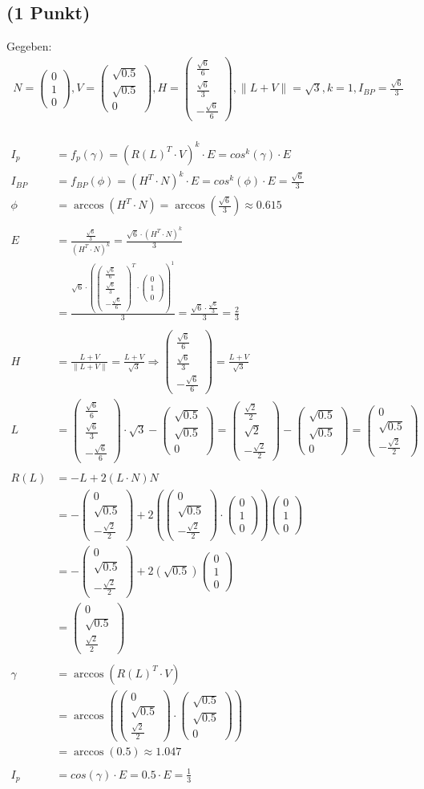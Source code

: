 \documentclass[a4paper,10pt,DIV=14]{article}
\begin{document}
\subsection{(1 Punkt)}%
\newcommand{\VecThree}[3]{\begin{pmatrix} #1 \\ #2 \\ #3 \end{pmatrix}}
Gegeben:
\begin{gather*}
N = \VecThree{0}{1}{0}, V = \VecThree{\sqrt{0.5}}{\sqrt{0.5}}{0}, H = \VecThree{\frac{\sqrt{6}}{6}}{\frac{\sqrt{6}}{3}}{-\frac{\sqrt{6}}{6}}, \lVert L+V \rVert = \sqrt{3}, k = 1, I_{BP} = \frac{\sqrt{6}}{3}
\end{gather*}
\\
\begin{align*}
I_p &= f_p(\gamma) = (R(L)^T \cdot V)^k \cdot E = cos^k(\gamma) \cdot E \\
I_{BP} &= f_{BP}(\phi) = (H^T \cdot N)^k \cdot E = cos^k(\phi) \cdot E = \frac{\sqrt{6}}{3}\\
\phi &= \arccos(H^T \cdot N) = \arccos\left(\frac{\sqrt{6}}{3}\right) \approx 0.615\\~\\
E &= \frac{\frac{\sqrt{6}}{3}}{(H^T \cdot N)^k} = \frac{\sqrt{6} \cdot (H^T \cdot N)^k}{3} \\
&= \frac{\sqrt{6} \cdot \left(\VecThree{\frac{\sqrt{6}}{6}}{\frac{\sqrt{6}}{3}}{-\frac{\sqrt{6}}{6}}^T \cdot \VecThree{0}{1}{0}\right)^1}{3} = \frac{\sqrt{6} \cdot \frac{\sqrt{6}}{3}}{3} =  \frac{2}{3}\\~\\
H &= \frac{L+V}{\lVert L+V \rVert} = \frac{L+V}{\sqrt{3}} \Rightarrow
\VecThree{\frac{\sqrt{6}}{6}}{\frac{\sqrt{6}}{3}}{-\frac{\sqrt{6}}{6}} = \frac{L+V}{\sqrt{3}} \\
L &= \VecThree{\frac{\sqrt{6}}{6}}{\frac{\sqrt{6}}{3}}{-\frac{\sqrt{6}}{6}} \cdot \sqrt{3} - \VecThree{\sqrt{0.5}}{\sqrt{0.5}}{0} = \VecThree{\frac{\sqrt{2}}{2}}{\sqrt{2}}{-\frac{\sqrt{2}}{2}} - \VecThree{\sqrt{0.5}}{\sqrt{0.5}}{0} = \VecThree{0}{\sqrt{0.5}}{-\frac{\sqrt{2}}{2}}\\~\\
R(L) &= - L + 2 \left(L \cdot N \right) N \\
&= - \VecThree{0}{\sqrt{0.5}}{-\frac{\sqrt{2}}{2}} + 2 \left(\VecThree{0}{\sqrt{0.5}}{-\frac{\sqrt{2}}{2}} \cdot \VecThree{0}{1}{0} \right) \VecThree{0}{1}{0} \\
&= - \VecThree{0}{\sqrt{0.5}}{-\frac{\sqrt{2}}{2}} + 2 \left( \sqrt{0.5} \right) \VecThree{0}{1}{0} \\ 
&= \VecThree{0}{\sqrt{0.5}}{\frac{\sqrt{2}}{2}}\\~\\
\gamma &= \arccos(R(L)^T \cdot V) \\
&= \arccos\left(\VecThree{0}{\sqrt{0.5}}{\frac{\sqrt{2}}{2}} \cdot \VecThree{\sqrt{0.5}}{\sqrt{0.5}}{0} \right) \\
&= \arccos(0.5) \approx 1.047\\~\\
I_p &= cos(\gamma) \cdot E = 0.5 \cdot E = \frac{1}{3}
\end{align*}
\end{document}
